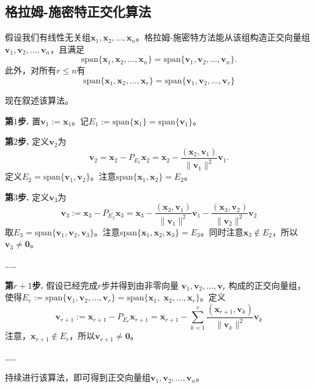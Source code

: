 \subsection{格拉姆-施密特正交化算法}

假设我们有线性无关组$\mathbf{x}_{1},\mathbf{x}_{2},\ldots,\mathbf{x}_{n}$。格拉姆-施密特方法能从该组构造正交向量组$\mathbf{v}_1,\mathbf{v}_2,\ldots,\mathbf{v}_n$，且满足
\[\mathrm{span}\{\mathbf{x}_{1},\mathbf{x}_{2},\ldots,\mathbf{x}_{n}\}=\mathrm{span}\{\mathbf{v}_{1},\mathbf{v}_{2},\ldots,\mathbf{v}_{n}\}.\]
此外，对所有$r\le n$有\[\mathrm{span}\{\mathbf{x}_1,\mathbf{x}_2,\ldots,\mathbf{x}_r\}=\mathrm{span}\{\mathbf{v}_1,\mathbf{v}_2,\ldots,\mathbf{v}_r\}\]

现在叙述该算法。

\noindent\textbf{第$1$步. }置$\mathbf{v}_{1}:=\mathbf{x}_{1}$。记$E_{1}:={\mathrm{span}}\{\mathbf{x}_{1}\}={\mathrm{span}}\{\mathbf{v}_{1}\}$。

\noindent\textbf{第$2$步. }定义$\mathbf{v}_2$为\[\mathbf{v}_2=\mathbf{x}_2-P_{E_1}\mathbf{x}_2=\mathbf{x}_2-\frac{(\mathbf{x}_2,\mathbf{v}_1)}{\|\mathbf{v}_1\|^2}\mathbf{v}_1.\] 
定义$E_2=\mathrm{span}\{\mathbf{v}_1,\mathbf{v}_2\}$。注意$\mathrm{span}\{\mathbf{x}_1,\mathbf{x}_2\}=E_2$。

\noindent\textbf{第$3$步. }定义$\mathbf{v}_3$为\[\mathbf{v}_{3}:=\mathbf{x}_{3}-P_{E_{2}}\mathbf{x}_{3}=\mathbf{x}_{3}-\frac{(\mathbf{x}_{3},\mathbf{v}_{1})}{\|\mathbf{v}_{1}\|^{2}}\mathbf{v}_{1}-\frac{(\mathbf{x}_{3},\mathbf{v}_{2})}{\|\mathbf{v}_{2}\|^{2}}\mathbf{v}_{2}\]
取$E_3=\mathrm{span}\{\mathbf{v}_1,\mathbf{v}_2,\mathbf{v}_3\}$。注意$\mathrm{span}\{\mathbf{x}_1,\mathbf{x}_2,\mathbf{x}_3\}=E_3$。同时注意$\mathbf{x}_3\notin E_2$，所以$\mathbf{v}_3\ne \mathbf{0}$。

……

\noindent\textbf{第$r+1$步. }假设已经完成$r$步并得到由非零向量 $\mathbf{v}_{1},\mathbf{v}_{2},\ldots,\mathbf{v}_{r}$ 构成的正交向量组，使得$E_{r}:=\mathrm{span}\{\mathbf{v}_{1},\mathbf{v}_{2},\ldots,\mathbf{v}_{r}\}=\mathrm{span}\{\mathbf{x}_{1},$ $\mathbf{x}_{2},\ldots,\mathbf{x}_{r}\}$。定义
\[\mathbf{v}_{r+1}:=\mathbf{x}_{r+1}-P_{E_r}\mathbf{x}_{r+1}=\mathbf{x}_{r+1}-\sum_{k=1}^r\frac{(\mathbf{x}_{r+1},\mathbf{v}_k)}{\|\mathbf{v}_k\|^2}\mathbf{v}_k\]
注意，$\mathbf{x}_{r+1}\notin E_r$，所以$\mathbf{v}_{r+1}\ne \mathbf{0}$。

……

持续进行该算法，即可得到正交向量组$\mathbf{v}_1,\mathbf{v}_2,\ldots,\mathbf{v}_n$。

